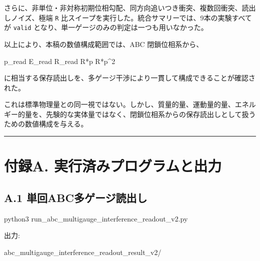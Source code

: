 \documentclass[
  a4paper,
]{article}
\newenvironment{Shaded}{}{}
\newcommand{\NormalTok}[1]{#1}
\begin{document}
さらに、非単位・非対称初期位相勾配、同方向追いつき衝突、複数回衝突、読出しノイズ、極端
\texttt{R} 比スイープを実行した。統合サマリーでは、9本の実験すべてが
\texttt{valid} となり、単一ゲージのみの判定は一つも用いなかった。

以上により、本稿の数値構成範囲では、ABC 閉鎖位相系から、

\begin{Shaded}
\begin{Highlighting}[]
\NormalTok{p\_read}
\NormalTok{E\_read}
\NormalTok{R\_read}
\NormalTok{R*p}
\NormalTok{R*p\^{}2}
\end{Highlighting}
\end{Shaded}

に相当する保存読出しを、多ゲージ干渉により一貫して構成できることが確認された。

これは標準物理量との同一視ではない。しかし、質量的量、運動量的量、エネルギー的量を、先験的な実体量ではなく、閉鎖位相系からの保存読出しとして扱うための数値構成を与える。

\begin{center}\rule{0.5\linewidth}{0.5pt}\end{center}

\section{付録A.
実行済みプログラムと出力}\label{ux4ed8ux9332a.-ux5b9fux884cux6e08ux307fux30d7ux30edux30b0ux30e9ux30e0ux3068ux51faux529b}

\subsection{A.1
単回ABC多ゲージ読出し}\label{a.1-ux5358ux56deabcux591aux30b2ux30fcux30b8ux8aadux51faux3057}

\begin{Shaded}
\begin{Highlighting}[]
\NormalTok{python3 run\_abc\_multigauge\_interference\_readout\_v2.py}
\end{Highlighting}
\end{Shaded}

出力:

\begin{Shaded}
\begin{Highlighting}[]
\NormalTok{abc\_multigauge\_interference\_readout\_result\_v2/}
\end{Highlighting}
\end{Shaded}
\end{document}
